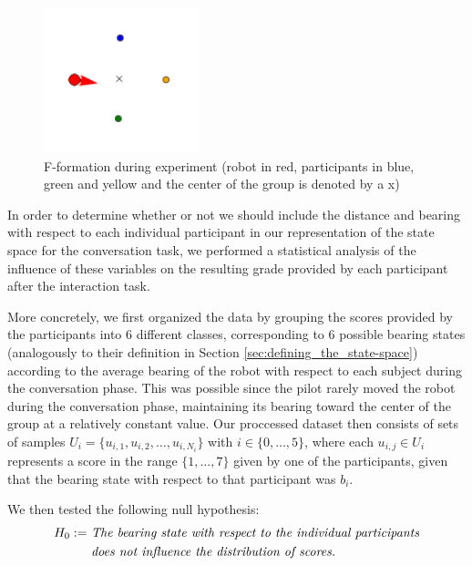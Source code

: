 \documentclass[a4paper,11pt]{report}
\begin{document}
\begin{figure}
    \centering
    \includegraphics[width=0.4\textwidth]{figures/o-space_twente_data.png}
    \caption{F-formation during experiment (robot in red, participants in blue, green and yellow and the center of the group is denoted by a x)}
    	\label{fig:F-formation_experiment}
\end{figure} 

In order to determine whether or not we should include the distance and bearing with respect to each individual participant in our representation of the state space for the conversation task, we performed a statistical analysis of the influence of these variables on the resulting grade provided by each participant after the interaction task.

More concretely, we first organized the data by grouping the scores provided by the participants into $6$ different classes, corresponding to $6$ possible bearing states (analogously to their definition in Section \ref{sec:defining_the_state-space}) according to the average bearing of the robot with respect to each subject during the conversation phase. This was possible since the pilot rarely moved the robot during the conversation phase, maintaining its bearing toward the center of the group at a relatively constant value. Our proccessed dataset then consists of sets of samples $U_i = \{u_{i,1},u_{i,2},\ldots,u_{i,N_i}\}$ with $i\in\{0,\ldots,5\}$, where each $u_{i,j}\in U_i$ represents a score in the range $\{1,\ldots,7\}$ given by one of the participants, given that the bearing state with respect to that participant was $b_i$.


We then tested the following null hypothesis:
\begin{align*}
 H_0 := & \text{ \textit{The bearing state with respect to the individual participants}}\\
        & \text{ \textit{does not influence the distribution of scores.}}
\end{align*}
\end{document}
